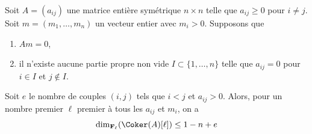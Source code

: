 \begin{lemma}
\label{lemma-recurring-symmetric-integer}
Soit $A = (a_{ij})$ une matrice entière symétrique $n \times n$ telle que
$a_{ij} \geq 0$ pour $i \not = j$. Soit $m = (m_1, \ldots, m_n)$ un
vecteur entier avec $m_i > 0$. Supposons que
\begin{enumerate}
\item $Am = 0$,
\item il n'existe aucune partie propre non vide $I \subset \{1, \ldots, n\}$
telle que $a_{ij} = 0$ pour $i \in I$ et $j \not \in I$.
\end{enumerate}
Soit $e$ le nombre de couples $(i, j)$ tels que $i < j$ et $a_{ij} > 0$.
Alors, pour un nombre premier $\ell$ premier à tous les $a_{ij}$ et $m_i$,
on a
$$
\dim_{\mathbf{F}_\ell}(\Coker(A)[\ell]) \leq 1 - n + e
$$
\end{lemma}

